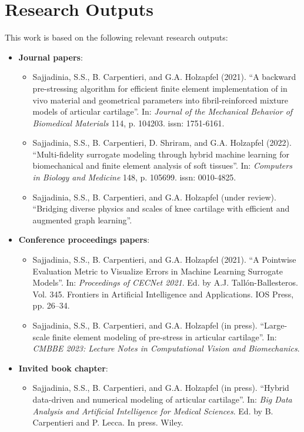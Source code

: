 \chapter*{Research Outputs}
This work is based on the following relevant research outputs:
%
\begin{itemize}
\item \textbf{Journal papers}:
\begin{itemize}
    \item Sajjadinia, S.S., B. Carpentieri, and G.A. Holzapfel (2021). “A backward pre-stressing algorithm for efficient finite element implementation of in vivo material and geometrical parameters into fibril-reinforced mixture models of articular cartilage”. In: \textit{Journal of the Mechanical Behavior of Biomedical Materials} 114, p. 104203. issn: 1751-6161.
    \item Sajjadinia, S.S., B. Carpentieri, D. Shriram, and G.A. Holzapfel (2022). “Multi-fidelity surrogate modeling through hybrid machine learning for biomechanical and finite element analysis of soft tissues”. In: \textit{Computers in Biology and Medicine} 148, p. 105699. issn: 0010-4825.
    \item Sajjadinia, S.S., B. Carpentieri, and G.A. Holzapfel (under review). “Bridging diverse physics and scales of knee cartilage with efficient and augmented graph learning”.
\end{itemize}
\item \textbf{Conference proceedings papers}:
\begin{itemize}
    \item Sajjadinia, S.S., B. Carpentieri, and G.A. Holzapfel (2021). “A Pointwise Evaluation Metric to Visualize Errors in Machine Learning Surrogate Models”. In: \textit{Proceedings of CECNet 2021}. Ed. by A.J. Tall\'{o}n-Ballesteros. Vol. 345. Frontiers in Artificial Intelligence and Applications. IOS Press, pp. 26–34.
    \item Sajjadinia, S.S., B. Carpentieri, and G.A. Holzapfel (in press). “Large-scale finite element modeling of pre-stress in articular cartilage”. In: \textit{CMBBE 2023: Lecture Notes in Computational Vision and Biomechanics}.
\end{itemize}
\item \textbf{Invited book chapter}:
\begin{itemize}
    \item Sajjadinia, S.S., B. Carpentieri, and G.A. Holzapfel (in press). “Hybrid data-driven and numerical modeling of articular cartilage”. In: \textit{Big Data Analysis and Artificial Intelligence for Medical Sciences}. Ed. by B. Carpentieri and P. Lecca. In press. Wiley.

\end{itemize}
\end{itemize}
